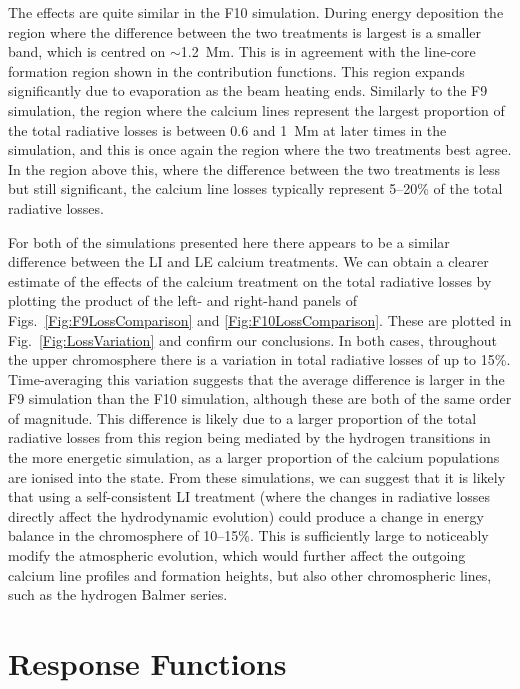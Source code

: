 The effects are quite similar in the F10 simulation.
During energy deposition the region where the difference between the two treatments is largest is a smaller band, which is centred on $\sim$\SI{1.2}{\mega\metre}.
This is in agreement with the line-core formation region shown in the contribution functions.
This region expands significantly due to evaporation as the beam heating ends.
Similarly to the F9 simulation, the region where the calcium lines represent the largest proportion of the total radiative losses is between 0.6 and \SI{1}{\mega\metre} at later times in the simulation, and this is once again the region where the two treatments best agree.
In the region above this, where the difference between the two treatments is less but still significant, the calcium line losses typically represent 5--20\% of the total radiative losses.

For both of the simulations presented here there appears to be a similar difference between the LI and LE calcium treatments.
We can obtain a clearer estimate of the effects of the calcium treatment on the total radiative losses by plotting the product of the left- and right-hand panels of Figs.~\ref{Fig:F9LossComparison} and \ref{Fig:F10LossComparison}.
These are plotted in Fig.~\ref{Fig:LossVariation} and confirm our conclusions.
In both cases, throughout the upper chromosphere there is a variation in total radiative losses of up to 15\%.
Time-averaging this variation suggests that the average difference is larger in the F9 simulation than the F10 simulation, although these are both of the same order of magnitude.
This difference is likely due to a larger proportion of the total radiative losses from this region being mediated by the hydrogen transitions in the more energetic simulation, as a larger proportion of the calcium populations are ionised into the \Caiii{} state.
From these simulations, we can suggest that it is likely that using a self-consistent LI treatment (where the changes in radiative losses directly affect the hydrodynamic evolution) could produce a change in energy balance in the chromosphere of 10--15\%.
This is sufficiently large to noticeably modify the atmospheric evolution, which would further affect the outgoing calcium line profiles and formation heights, but also other chromospheric lines, such as the hydrogen Balmer series.

\section{Response Functions}

